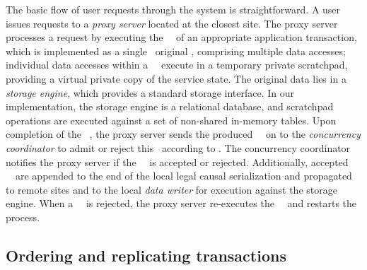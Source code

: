The basic flow of user requests through the system is straightforward.
A user issues requests to a {\em proxy server} located at the closest
site. The proxy server processes a request by executing the \initial\ \operation\ of an
appropriate application transaction, which is implemented as a single
\gemini\ original \operation, comprising multiple data accesses; individual
data accesses within a \initial\ \operation\ execute in a temporary
private scratchpad, providing a virtual private copy of
  the service state. The original data lies in a {\em storage engine}, which provides a standard
storage interface. In our implementation, the storage
  engine is a relational database, and scratchpad operations are
  executed against a set of non-shared in-memory tables. Upon completion of the
\initial\ \operation, the proxy server sends the produced
\shadow\ \operation\ on to the {\em concurrency coordinator} to admit
or reject this \operation\ according to \RBc. The concurrency
coordinator notifies the proxy server if the \shadow\ \operation\ is accepted
or rejected.  Additionally, accepted \shadow\ \operations\ are
appended to the end of the local legal causal serialization and propagated to remote
sites and to the local {\em data writer} for execution against the
storage engine.  When a \shadow\ \operation\ is rejected, the proxy
server re-executes the \initial\ \operation\ and restarts the process.


\subsection{Ordering and replicating transactions}



